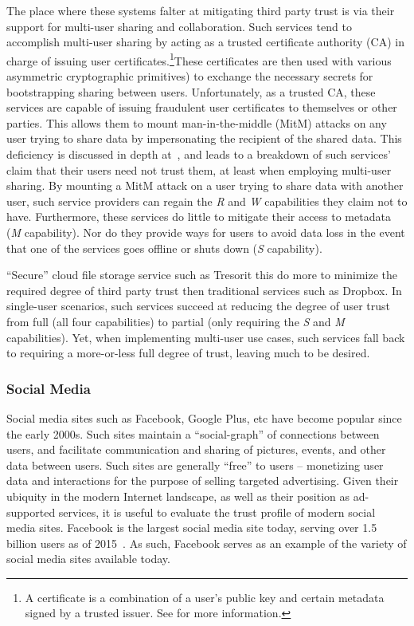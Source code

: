The place where these systems falter at mitigating third party trust
is via their support for multi-user sharing and collaboration. Such
services tend to accomplish multi-user sharing by acting as a trusted
certificate authority (CA) in charge of issuing user
certificates.\footnote{A certificate is a combination of a user's
  public key and certain metadata signed by a trusted issuer. See for
  more information.}These certificates are then used with various
asymmetric cryptographic primitives) to exchange the necessary secrets
for bootstrapping sharing between users. Unfortunately, as a trusted
CA, these services are capable of issuing fraudulent user certificates
to themselves or other parties. This allows them to mount
man-in-the-middle (MitM) attacks on any user trying to share data by
impersonating the recipient of the shared data. This deficiency is
discussed in depth at~\cite{wilson2014}, and leads to a breakdown of
such services' claim that their users need not trust them, at least
when employing multi-user sharing. By mounting a MitM attack on a user
trying to share data with another user, such service providers can
regain the \emph{R} and \emph{W} capabilities they claim not to
have. Furthermore, these services do little to mitigate their access
to metadata (\emph{M} capability). Nor do they provide ways for users
to avoid data loss in the event that one of the services goes offline
or shuts down (\emph{S} capability).

``Secure'' cloud file storage service such as Tresorit this do more to
minimize the required degree of third party trust then traditional
services such as Dropbox. In single-user scenarios, such services
succeed at reducing the degree of user trust from full (all four
capabilities) to partial (only requiring the \emph{S} and \emph{M}
capabilities). Yet, when implementing multi-user use cases, such
services fall back to requiring a more-or-less full degree of trust,
leaving much to be desired.

\subsubsection{Social Media}

Social media sites such as Facebook, Google Plus, etc have become
popular since the early 2000s. Such sites maintain a ``social-graph''
of connections between users, and facilitate communication and sharing
of pictures, events, and other data between users. Such sites are
generally ``free'' to users -- monetizing user data and interactions
for the purpose of selling targeted advertising. Given their ubiquity
in the modern Internet landscape, as well as their position as
ad-supported services, it is useful to evaluate the trust profile of
modern social media sites. Facebook is the largest social media site
today, serving over 1.5 billion users as of 2015~\cite{foster2014}. As
such, Facebook serves as an example of the variety of social media
sites available today.

